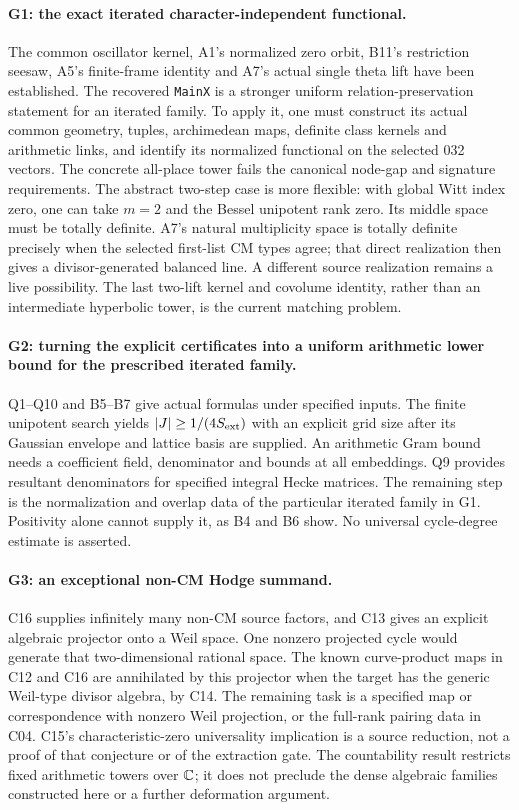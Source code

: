 \documentclass[11pt]{article}
\theoremstyle{definition}\newtheorem{definition}[theorem]{Definition}\newtheorem{remark}[theorem]{Remark}
\begin{document}
\paragraph{G1: the exact iterated character-independent functional.}
The common oscillator kernel, A1's normalized zero orbit, B11's
restriction seesaw, A5's finite-frame identity and A7's actual single
theta lift have been established. The recovered \texttt{MainX} is
a stronger uniform relation-preservation statement for an iterated
family. To apply it, one must construct its actual common geometry,
tuples, archimedean maps, definite class kernels and arithmetic links,
and identify its normalized functional on the selected 032 vectors.
The concrete all-place tower fails the canonical node-gap and
signature requirements. The abstract two-step case is more flexible:
with global Witt index zero, one can take $m=2$ and the Bessel
unipotent rank zero. Its middle space must be totally definite.
A7's natural multiplicity space is totally definite precisely when
the selected first-list CM types agree; that direct realization then
gives a divisor-generated balanced line. A different source
realization remains a live possibility. The last two-lift kernel
and covolume identity, rather than an intermediate hyperbolic tower,
is the current matching problem.

\paragraph{G2: turning the explicit certificates into a uniform
arithmetic lower bound for the prescribed iterated family.}
Q1--Q10 and B5--B7 give actual formulas under specified inputs.
The finite unipotent search yields $|J|\geq1/(4S_{\rm ext})$ with
an explicit grid size after its Gaussian envelope and lattice basis
are supplied. An arithmetic Gram bound needs a coefficient field,
denominator and bounds at all embeddings. Q9 provides resultant
denominators for specified integral Hecke matrices. The remaining
step is the normalization and overlap data of the particular
iterated family in G1. Positivity alone cannot supply it, as B4
and B6 show. No universal cycle-degree estimate is asserted.

\paragraph{G3: an exceptional non-CM Hodge summand.}
C16 supplies infinitely many non-CM source factors, and C13 gives
an explicit algebraic projector onto a Weil space. One nonzero
projected cycle would generate that two-dimensional rational space.
The known curve-product maps in C12 and C16 are annihilated by this
projector when the target has the generic Weil-type divisor algebra,
by C14. The remaining task is a specified map or correspondence
with nonzero Weil projection, or the full-rank pairing data in C04.
C15's characteristic-zero universality implication is a source
reduction, not a proof of that conjecture or of the extraction gate.
The countability result restricts fixed arithmetic towers over
$\mathbb C$; it does not preclude the dense algebraic families constructed
here or a further deformation argument.
\end{document}
